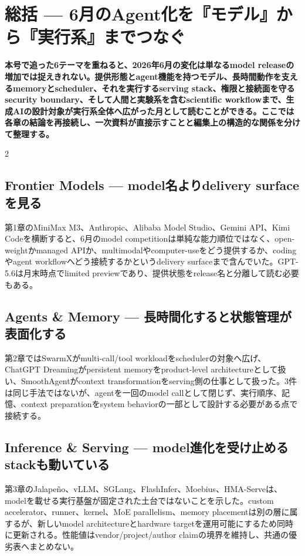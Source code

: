 \section{総括 — 6月のAgent化を『モデル』から『実行系』までつなぐ}
\label{sec:retrospective-synthesis}
\noindent\textbf{本号で追った6テーマを重ねると、2026年6月の変化は単なるmodel releaseの増加では捉えきれない。提供形態とagent機能を持つモデル、長時間動作を支えるmemoryとscheduler、それを実行するserving stack、権限と接続面を守るsecurity boundary、そして人間と実験系を含むscientific workflowまで、生成AIの設計対象が実行系全体へ広がった月として読むことができる。ここでは各章の結論を再接続し、一次資料が直接示すことと編集上の構造的な関係を分けて整理する。}
\medskip
\begin{multicols}{2}
\subsection{Frontier Models — model名よりdelivery surfaceを見る}
第1章のMiniMax M3、Anthropic、Alibaba Model Studio、Gemini API、Kimi Codeを横断すると、6月のmodel competitionは単純な能力順位ではなく、open-weightかmanaged APIか、multimodalやcomputer-useをどう提供するか、codingやagent workflowへどう接続するかというdelivery surfaceまで含んでいた。GPT-5.6は月末時点でlimited previewであり、提供状態をrelease名と分離して読む必要もある。 \cite{src-d8e13386974c,src-f6aa679babd7,src-a24fd97eb3d0,src-9191d43918fc,src-30f48121decc}

\subsection{Agents \& Memory — 長時間化すると状態管理が表面化する}
第2章ではSwarmXがmulti-call/tool workloadをschedulerの対象へ広げ、ChatGPT Dreamingがpersistent memoryをproduct-level architectureとして扱い、SmoothAgentがcontext transformationをserving側の仕事として扱った。3件は同じ手法ではないが、agentを一回のmodel callとして閉じず、実行順序、記憶、context preparationをsystem behaviorの一部として設計する必要がある点で接続する。 \cite{src-e8d9fd84bddc,src-c3ab33c62226,src-80f8b4d899ff}

\subsection{Inference \& Serving — model進化を受け止めるstackも動いている}
第3章のJalapeño、vLLM、SGLang、FlashInfer、Moebius、HMA-Serveは、modelを載せる実行基盤が固定された土台ではないことを示した。custom accelerator、runner、kernel、MoE parallelism、memory placementは別の層に属するが、新しいmodel architectureとhardware targetを運用可能にするため同時に更新される。性能値はvendor/project/author claimの境界を維持し、共通の優劣表へまとめない。 \cite{src-855db08b75f6,src-6cc910fb0183,src-538cecdad845,src-272a6dac5bcc,src-43606e2afafd,src-a66d76643eee}


\end{multicols}
